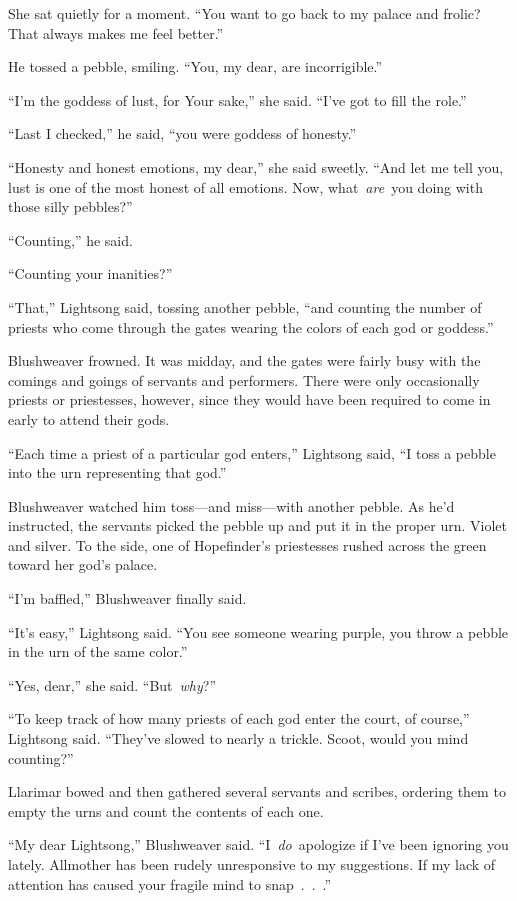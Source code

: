 She sat quietly for a moment. “You want to go back to my palace and frolic? That always makes me feel better.”

He tossed a pebble, smiling. “You, my dear, are incorrigible.”

“I’m the goddess of lust, for Your sake,” she said. “I’ve got to fill the role.”

“Last I checked,” he said, “you were goddess of honesty.”

“Honesty and honest emotions, my dear,” she said sweetly. “And let me tell you, lust is one of the most honest of all emotions. Now, what~\textit{are}~you doing with those silly pebbles?”

“Counting,” he said.

“Counting your inanities?”

“That,” Lightsong said, tossing another pebble, “and counting the number of priests who come through the gates wearing the colors of each god or goddess.”

Blushweaver frowned. It was midday, and the gates were fairly busy with the comings and goings of servants and performers. There were only occasionally priests or priestesses, however, since they would have been required to come in early to attend their gods.

“Each time a priest of a particular god enters,” Lightsong said, “I toss a pebble into the urn representing that god.”

Blushweaver watched him toss—and miss—with another pebble. As he’d instructed, the servants picked the pebble up and put it in the proper urn. Violet and silver. To the side, one of Hopefinder’s priestesses rushed across the green toward her god’s palace.

“I’m baffled,” Blushweaver finally said.

“It’s easy,” Lightsong said. “You see someone wearing purple, you throw a pebble in the urn of the same color.”

“Yes, dear,” she said. “But~\textit{why}?”

“To keep track of how many priests of each god enter the court, of course,” Lightsong said. “They’ve slowed to nearly a trickle. Scoot, would you mind counting?”

Llarimar bowed and then gathered several servants and scribes, ordering them to empty the urns and count the contents of each one.

“My dear Lightsong,” Blushweaver said. “I~\textit{do}~apologize if I’ve been ignoring you lately. Allmother has been rudely unresponsive to my suggestions. If my lack of attention has caused your fragile mind to snap~.~.~.”

